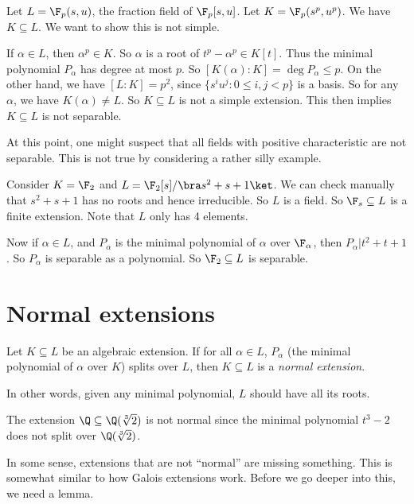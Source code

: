 \documentclass[a4paper]{article}
\begin{document}
\begin{eg}
  Let $L = \F_p(s, u)$, the fraction field of $\F_p[s, u]$. Let $K = \F_p(s^p, u^p)$. We have $K\subseteq L$. We want to show this is not simple.

  If $\alpha \in L$, then $\alpha^p \in K$. So $\alpha$ is a root of $t^p - \alpha^p \in K[t]$. Thus the minimal polynomial $P_\alpha$ has degree at most $p$. So $[K(\alpha): K] = \deg P_\alpha \leq p$. On the other hand, we have $[L:K] = p^2$, since $\{s^iu^j: 0 \leq i, j < p\}$ is a basis. So for any $\alpha$, we have $K(\alpha) \not= L$. So $K\subseteq L$ is not a simple extension. This then implies $K\subseteq L$ is not separable.
\end{eg}
At this point, one might suspect that all fields with positive characteristic are not separable. This is not true by considering a rather silly example.
\begin{eg}
  Consider $K = \F_2$ and $L = \F_2[s]/\bra s^2 + s + 1\ket$. We can check manually that $s^2 + s + 1$ has no roots and hence irreducible. So $L$ is a field. So $\F_s \subseteq L$ is a finite extension. Note that $L$ only has 4 elements.

  Now if $\alpha \in L$, and $P_\alpha$ is the minimal polynomial of $\alpha$ over $\F_\alpha$, then $P_\alpha| t^2 + t + 1$. So $P_\alpha$ is separable as a polynomial. So $\F_2 \subseteq L$ is separable.
\end{eg}

\section{Normal extensions}

\begin{defi}
  Let $K \subseteq L$ be an algebraic extension. If for all $\alpha \in L$, $P_\alpha$ (the minimal polynomial of $\alpha$ over $K$) splits over $L$, then $K\subseteq L$ is a \emph{normal extension}.
\end{defi}
In other words, given any minimal polynomial, $L$ should have all its roots.

\begin{eg}
  The extension $\Q\subseteq \Q(\sqrt[3]{2})$ is not normal since the minimal polynomial $t^3 - 2$ does not split over $\Q(\sqrt[3]{2})$.
\end{eg}
In some sense, extensions that are not ``normal'' are missing something. This is somewhat similar to how Galois extensions work. Before we go deeper into this, we need a lemma.
\end{document}
